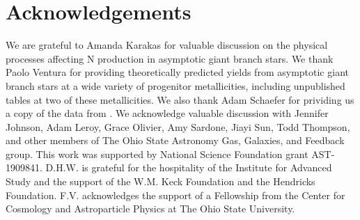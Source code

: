 \documentclass[ms.tex]{subfiles}
\begin{document}
\section{Acknowledgements}
\label{sec:acknowledgements}

We are grateful to Amanda Karakas for valuable discussion on the physical
processes affecting N production in asymptotic giant branch stars.
We thank Paolo Ventura for providing theoretically predicted yields from
asymptotic giant branch stars at a wide variety of progenitor metallicities,
including unpublished tables at two of these metallicities.
We also thank Adam Schaefer for prividing us a copy of the data from
\citet{Schaefer2020}.
We acknowledge valuable discussion with Jennifer Johnson, Adam Leroy, Grace
Olivier, Amy Sardone, Jiayi Sun, Todd Thompson, and other members of The Ohio
State Astronomy Gas, Galaxies, and Feedback group.
This work was supported by National Science Foundation grant AST-1909841.
D.H.W. is grateful for the hospitality of the Institute for Advanced Study and
the support of the W.M. Keck Foundation and the Hendricks Foundation.
F.V. acknowledges the support of a Fellowship from the Center for Cosmology and
Astroparticle Physics at The Ohio State University.
\end{document}
